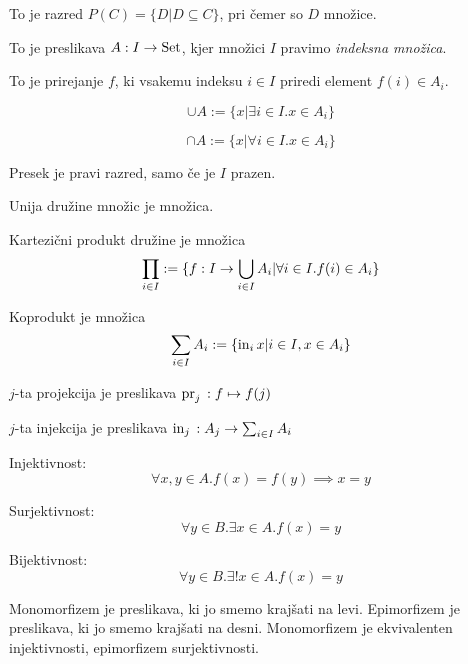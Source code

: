 
To je razred $P(C) = \{D | D \subseteq C\}$, pri čemer so $D$ množice.


To je preslikava $A: I \to \text{Set}$, kjer množici $I$ pravimo \textit{indeksna množica}.


To je prirejanje $f$, ki vsakemu indeksu $i \in I$ priredi element $f(i) \in A_i$.


\[
	\cup A := \{x | \exists i \in I. x\in A_i\}
\]

\[
	\cap A := \{x | \forall i \in I. x\in A_i\}
\]

Presek je pravi razred, samo če je $I$ prazen.


Unija družine množic je množica.


Kartezični produkt družine je množica \[
	\prod_{i\in I} := \{f: I \to \bigcup_{i\in I} A_i | \forall i \in I . f(i) \in A_i\}
\]

Koprodukt je množica \[
	\sum_{i\in I} A_i := \{\mathrm{in}_i\, x | i \in I, x \in A_i \}
\]


$j$-ta projekcija je preslikava $\mathrm{pr}_j\, : f \mapsto f(j)$

$j$-ta injekcija je preslikava $\mathrm{in}_j\, : A_j \to \sum_{i\in I} A_i$


Injektivnost: \[
	\forall x,y \in A.f(x) = f(y) \implies x = y
\]

Surjektivnost: \[
	\forall y \in B. \exists x \in A.f(x) = y
\]

Bijektivnost: \[
	\forall y \in B. \exists! x \in A.f(x) = y
\]


Monomorfizem je preslikava, ki jo smemo krajšati na levi. Epimorfizem je preslikava, ki jo smemo krajšati na desni. Monomorfizem je ekvivalenten injektivnosti, epimorfizem surjektivnosti.

